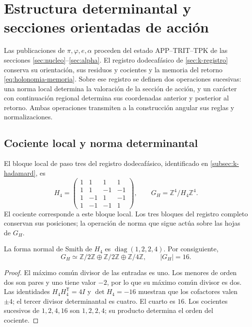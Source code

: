 \section{Estructura determinantal y secciones orientadas de acción}
\label{iv:action:section}

Las publicaciones de \(\pi,\varphi,e,\alpha\) proceden del estado
APP--TRIT--TPK de las secciones
\ref{sec:nucleo}--\ref{sec:alpha}. El registro dodecafásico de
\ref{sec:k-registro} conserva su orientación, sus residuos y
cocientes y la memoria del retorno
\eqref{eq:holonomia-memoria}. Sobre ese registro se definen dos operaciones
sucesivas: una norma local determina la valoración de la sección de
acción, y un carácter con continuación regional determina sus
coordenadas anterior y posterior al retorno. Ambas operaciones
transmiten a la construcción angular sus reglas y normalizaciones.

\subsection{Cociente local y norma determinantal}
\label{iv:action:determinantal}

El bloque local de paso tres del registro dodecafásico, identificado
en \ref{subsec:k-hadamard}, es
\begin{equation}
 H_4=\begin{pmatrix}
 1&1&1&1\\
 1&1&-1&-1\\
 1&-1&1&-1\\
 1&-1&-1&1
 \end{pmatrix},
 \qquad G_H=\mathbb Z^4/H_4\mathbb Z^4.
 \label{iv:action:h4}
\end{equation}
El cociente corresponde a este bloque local. Los tres bloques del
registro completo conservan sus posiciones; la operación de norma
que sigue actúa sobre las hojas de \(G_H\).

\begin{lemma}
\label{iv:action:smith}
La forma normal de Smith de \(H_4\) es
\(\operatorname{diag}(1,2,2,4)\). Por consiguiente,
\[
 G_H\simeq\mathbb Z/2\mathbb Z\oplus\mathbb Z/2\mathbb Z
       \oplus\mathbb Z/4\mathbb Z,\qquad |G_H|=16.
\]
\end{lemma}
\begin{proof}
El máximo común divisor de las entradas es uno. Los menores de
orden dos son pares y uno tiene valor \(-2\), por lo que su máximo
común divisor es dos. Las identidades
\(H_4H_4^{\mathsf T}=4I\) y \(\det H_4=-16\) muestran que los
cofactores valen \(\pm4\); el tercer divisor determinantal es
cuatro. El cuarto es \(16\). Los cocientes sucesivos de
\(1,2,4,16\) son \(1,2,2,4\); su producto determina el orden
del cociente.
\end{proof}

